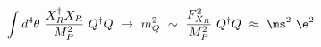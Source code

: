 \begin{equation}
\int d^4 \theta \ { X_R^\dagger X_R  \over M_P^2} \ Q^\dagger Q \ \to
\ m_Q^2 \ \sim  \ {F_{X_R}^2 \over M_P^2} \ Q^\dagger Q \ \approx \
\ms^2 \ \e^2 
\end{equation}

